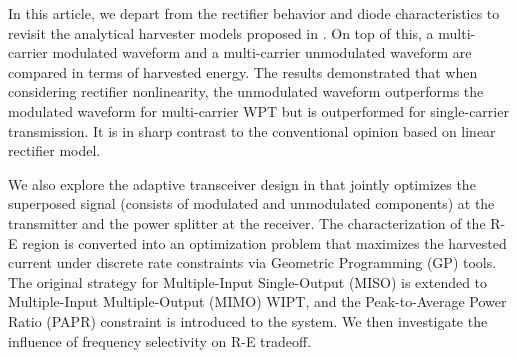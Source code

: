 In this article, we depart from the rectifier behavior and diode characteristics to revisit the analytical harvester models proposed in \cite{Clerckx2016}. On top of this, a multi-carrier modulated waveform and a multi-carrier unmodulated waveform are compared in terms of harvested energy. The results demonstrated that when considering rectifier nonlinearity, the unmodulated waveform outperforms the modulated waveform for multi-carrier WPT but is outperformed for single-carrier transmission. It is in sharp contrast to the conventional opinion based on linear rectifier model.

We also explore the adaptive transceiver design in \cite{Clerckx2018} that jointly optimizes the superposed signal (consists of modulated and unmodulated components) at the transmitter and the power splitter at the receiver. The characterization of the R-E region is converted into an optimization problem that maximizes the harvested current under discrete rate constraints via Geometric Programming (GP) tools. The original strategy for Multiple-Input Single-Output (MISO) is extended to Multiple-Input Multiple-Output (MIMO) WIPT, and the Peak-to-Average Power Ratio (PAPR) constraint is introduced to the system. We then investigate the influence of frequency selectivity on R-E tradeoff. 